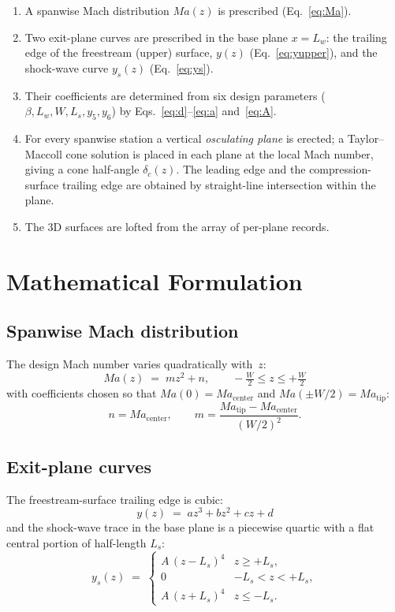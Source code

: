 \documentclass[11pt,a4paper]{article}
\newcommand{\Ma}{\mathit{Ma}}
\newcommand{\Lw}{L_{w}}
\newcommand{\Ls}{L_{s}}
\newcommand{\dc}{\delta_{c}}
\begin{document}
\begin{enumerate}
\item A spanwise Mach distribution $\Ma(z)$ is prescribed
      (Eq.~\ref{eq:Ma}).
\item Two exit-plane curves are prescribed in the base plane $x=\Lw$:
      the trailing edge of the freestream (upper) surface, $y(z)$
      (Eq.~\ref{eq:yupper}), and the shock-wave curve $y_{s}(z)$
      (Eq.~\ref{eq:ys}).
\item Their coefficients are determined from six design parameters
      ($\beta, \Lw, W, \Ls, y_{5}, y_{6}$) by Eqs.~\ref{eq:d}--\ref{eq:a}
      and~\ref{eq:A}.
\item For every spanwise station a vertical \emph{osculating plane}
      is erected; a Taylor--Maccoll cone solution is placed in each
      plane at the local Mach number, giving a cone half-angle
      $\dc(z)$. The leading edge and the compression-surface trailing
      edge are obtained by straight-line intersection within the plane.
\item The 3D surfaces are lofted from the array of per-plane records.
\end{enumerate}

\section{Mathematical Formulation}

\subsection{Spanwise Mach distribution}

The design Mach number varies quadratically with~$z$:
\begin{equation}
\boxed{\;\Ma(z) \;=\; m z^{2} + n, \qquad -\tfrac{W}{2} \le z \le +\tfrac{W}{2}\;}
\label{eq:Ma}
\end{equation}
with coefficients chosen so that $\Ma(0)=\Ma_{\mathrm{center}}$ and
$\Ma(\pm W/2)=\Ma_{\mathrm{tip}}$:
\[
 n = \Ma_{\mathrm{center}}, \qquad
 m = \frac{\Ma_{\mathrm{tip}} - \Ma_{\mathrm{center}}}{(W/2)^{2}} .
\]

\subsection{Exit-plane curves}

The freestream-surface trailing edge is cubic:
\begin{equation}
\boxed{\;y(z) \;=\; a z^{3} + b z^{2} + c z + d \;}
\label{eq:yupper}
\end{equation}
and the shock-wave trace in the base plane is a piecewise quartic
with a flat central portion of half-length $\Ls$:
\begin{equation}
y_{s}(z) \;=\;
\begin{cases}
 A\,(z-\Ls)^{4} & z \ge +\Ls,\\
 0 & -\Ls<z<+\Ls,\\
 A\,(z+\Ls)^{4} & z \le -\Ls.
\end{cases}
\label{eq:ys}
\end{equation}
\end{document}
